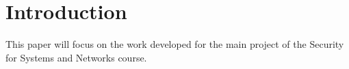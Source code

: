 \section{Introduction}

This paper will focus on the work developed for the main project of the 
Security for Systems and Networks course.

